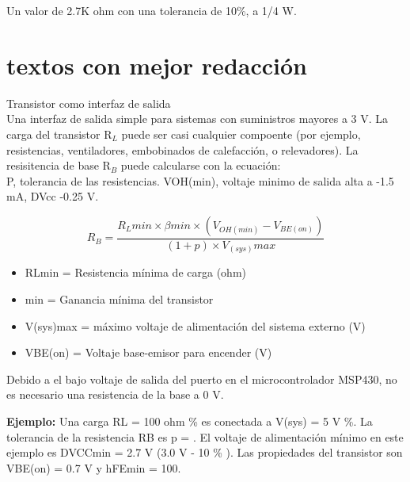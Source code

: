     \begin{center}
        Un valor de 2.7K ohm con una tolerancia de 10\%, a 1/4 W.\\
    \end{center}
    
\section{textos con mejor redacción}
    Transistor como interfaz de salida\cite{texas-calculations}  \\
    
    Una interfaz de salida simple para sistemas con suministros mayores a 3 V. La carga del transistor R$_L$ puede ser casi cualquier compoente (por ejemplo, resistencias, ventiladores, embobinados de calefacción, o relevadores). La resisitencia de base R$_B$ puede calcularse con la ecuación:\\
    
    P, tolerancia de las resistencias. VOH(min), voltaje minimo de salida alta a -1.5 mA, DVcc -0.25 V.
    
    \begin{equation}
        R_{B} = \frac { R_{L}min \times \beta min \times ( V_{OH(min)} - V_{BE(on)}) }   { (1 + p)\times V_{(sys)}max }
    \end{equation}
    
    \begin{itemize}
        \item {
            \setlength{\parskip}{-1mm}
            RLmin = Resistencia mínima de carga (ohm)
            }
        \item {
            \setlength{\parskip}{-1mm}
            \betha min = Ganancia mínima del transistor
            }
        \item {
            \setlength{\parskip}{-1mm}
            V(sys)max = máximo voltaje de alimentación del sistema externo (V)
            }        
        \item {
            \setlength{\parskip}{-1mm}
            VBE(on) = Voltaje base-emisor para encender (V)
            }
    \end{itemize}
    
    Debido a el bajo voltaje de salida del puerto en el microcontrolador MSP430, no es necesario una resistencia de la base a 0 V. 
    
    \textbf{Ejemplo:} Una carga RL = 100 ohm \% es conectada a V(sys) = 5 V \%. La tolerancia de la resistencia RB es p =  \5. El voltaje de alimentación mínimo en este ejemplo es DVCCmin = 2.7 V (3.0 V - 10 \% ). Las propiedades del transistor son VBE(on) = 0.7 V y hFEmin = 100.
    
